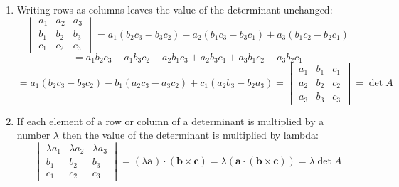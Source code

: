 \documentclass{article}
\renewcommand{\vec}[1]{\bm{#1}}
\newcommand{\vv}[1]{\vec{#1}}
\begin{document}
\begin{enumerate}

   \item Writing rows as columns leaves the value of the determinant unchanged:
      \[
      \begin{vmatrix}
         a_1 & a_2 & a_3\\
         b_1 & b_2 & b_3\\
         c_1 & c_2 & c_3
      \end{vmatrix}
      = a_1(b_2c_3-b_3c_2)-a_2(b_1c_3-b_3c_1)+a_3(b_1c_2-b_2c_1)\]
      \[= a_1b_2c_3-a_1b_3c_2-a_2b_1c_3+a_2b_3c_1+a_3b_1c_2-a_3b_2c_1\]
      \[=a_1(b_2c_3-b_3c_2)-b_1(a_2c_3-a_3c_2)+c_1(a_2b_3-b_2a_3)=
      \begin{vmatrix}
         a_1 & b_1 & c_1\\
         a_2 & b_2 & c_2\\
         a_3 & b_3 & c_3
      \end{vmatrix}
      =\det A\]

   \item If each element of a row or column of a determinant is multiplied by a number \(\lambda\) then the value of the determinant is multiplied by lambda:
      \[
      \begin{vmatrix}
         \lambda a_1 & \lambda a_2 & \lambda a_3\\
         b_1 & b_2 & b_3\\
         c_1 & c_2 & c_3
      \end{vmatrix}
      =(\lambda\vv a)\cdot(\vv b\times\vv c)=\lambda(\vv a\cdot(\vv b\times\vv c))=\lambda\det A\]


\end{enumerate}
\end{document}
